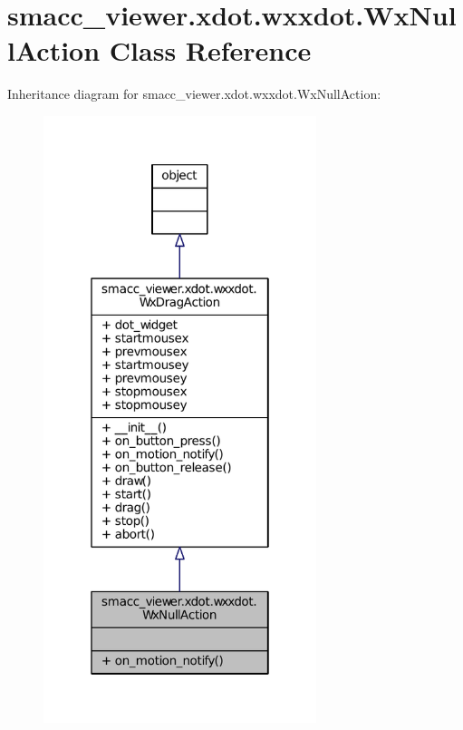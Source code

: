 \hypertarget{classsmacc__viewer_1_1xdot_1_1wxxdot_1_1WxNullAction}{}\section{smacc\+\_\+viewer.\+xdot.\+wxxdot.\+Wx\+Null\+Action Class Reference}
\label{classsmacc__viewer_1_1xdot_1_1wxxdot_1_1WxNullAction}


Inheritance diagram for smacc\+\_\+viewer.\+xdot.\+wxxdot.\+Wx\+Null\+Action\+:
\nopagebreak
\begin{figure}[H]
\begin{center}
\leavevmode
\includegraphics[width=226pt]{classsmacc__viewer_1_1xdot_1_1wxxdot_1_1WxNullAction__inherit__graph}
\end{center}
\end{figure}


